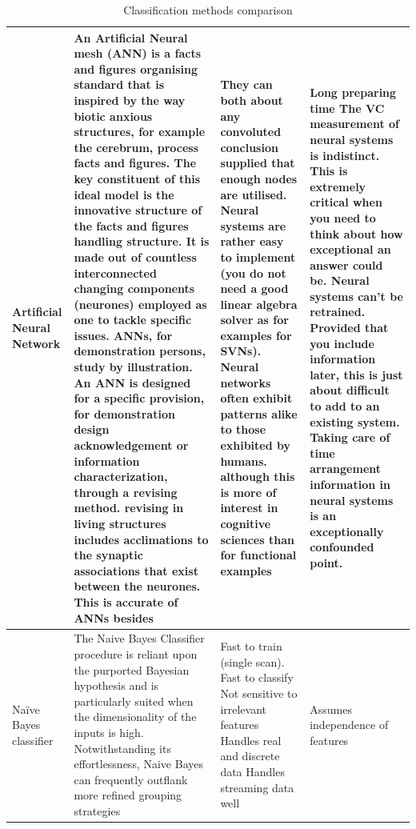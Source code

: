 \documentclass[12pt, letterpaper]{article}
\begin{document}
\begin{center}
\begin{longtable}{p{2cm}|p{3cm}|p{3cm}|p{3cm}}
			Artificial Neural Network & An Artificial Neural mesh (ANN) is a facts and figures organising standard that is inspired by the way biotic anxious structures, for example the cerebrum, process facts and figures. The key constituent of this ideal model is the innovative structure of the facts and figures handling structure. It is made out of countless interconnected changing components (neurones) employed as one to tackle specific issues. ANNs, for demonstration persons, study by illustration. An ANN is designed for a specific provision, for demonstration design acknowledgement or information characterization, through a revising method. revising in living structures includes acclimations to the synaptic associations that exist between the neurones. This is accurate of ANNs besides & They can both about any convoluted conclusion supplied that enough nodes are utilised. Neural systems are rather easy to implement (you do not need a good linear algebra solver as for examples for SVNs). Neural networks often exhibit patterns alike to those exhibited by humans. although this is more of interest in cognitive sciences than for functional examples & Long preparing time The VC measurement of neural systems is indistinct. This is extremely critical when you need to think about how exceptional an answer could be. Neural systems can't be retrained. Provided that you include information later, this is just about difficult to add to an existing system. Taking care of time arrangement information in neural systems is an exceptionally confounded point.\\
			\hline
			Naïve Bayes classifier&The Naive Bayes Classifier procedure is reliant upon the purported Bayesian hypothesis and is particularly suited when the dimensionality of the inputs is high. Notwithstanding its effortlessness, Naive Bayes can frequently outflank more refined grouping strategies&Fast to train (single scan). Fast to classify Not sensitive to irrelevant features Handles real and discrete data Handles streaming data well&Assumes independence of features
			\hline
			\caption{Classification methods comparison}
			\label{tab:ClassificationMethodsComparison}
		\end{longtable}
	
\end{center}
\end{document}
